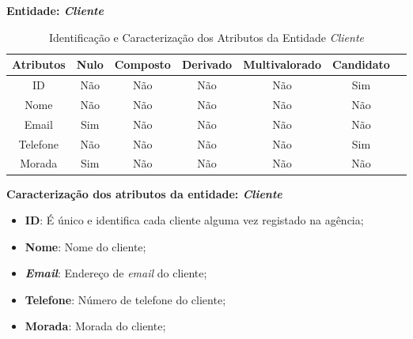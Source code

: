 \documentclass[a4paper,12pt]{scrreprt}
\newcommand{\Nao}{%
    \cellcolor{red!40}Não
}
\newcommand{\Sim}{%
    \cellcolor{green!40}Sim
}
\begin{document}
        \textbf{Entidade: \textit{Cliente}}
        \begin{table}[!ht]
        \centering
        \begin{tabular}{|c|c|c|c|c|c|c|}
        \hline
        \rowcolor{gray!20!white}
        \textbf{Atributos} & \textbf{Nulo} & \textbf{Composto} & \textbf{Derivado} & \textbf{Multivalorado} & \textbf{Candidato} \\
        \hline
        ID                  & \Nao & \Nao & \Nao & \Nao & \Sim \\
        Nome                & \Nao & \Nao & \Nao & \Nao & \Nao \\  
        Email               & \Sim & \Nao & \Nao & \Nao & \Nao \\
        Telefone            & \Nao & \Nao & \Nao & \Nao & \Sim \\
        Morada              & \Sim & \Nao & \Nao & \Nao & \Nao \\
        \hline
        \end{tabular}
        \caption{Identificação e Caracterização dos Atributos da Entidade \textit{Cliente}}
        \end{table}

        \textbf{Caracterização dos atributos da entidade: \textit{Cliente}}
        \begin{itemize}
            \item \textbf{ID}: É único e identifica cada cliente alguma vez registado na agência;
            \item \textbf{Nome}: Nome do cliente;
            \item \textbf{\textit{Email}}: Endereço de \textit{email} do cliente; 
            \item \textbf{Telefone}: Número de telefone do cliente;
            \item \textbf{Morada}: Morada do cliente;
        \end{itemize}


    \clearpage
    
\end{document}
